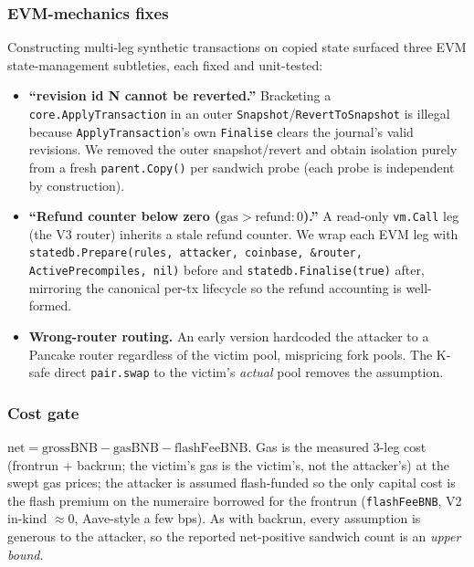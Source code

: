 \documentclass[11pt]{article}
\newcommand{\code}[1]{\texttt{#1}}
\begin{document}
\subsubsection{EVM-mechanics fixes}
\label{sec:evmfixes}
Constructing multi-leg synthetic transactions on copied state surfaced three EVM
state-management subtleties, each fixed and unit-tested:
\begin{itemize}
  \item \textbf{``revision id N cannot be reverted.''} Bracketing a
    \code{core.ApplyTransaction} in an outer \code{Snapshot}/\code{RevertToSnapshot}
    is illegal because \code{ApplyTransaction}'s own \code{Finalise} clears the
    journal's valid revisions. We removed the outer snapshot/revert and obtain
    isolation purely from a fresh \code{parent.Copy()} per sandwich probe (each probe
    is independent by construction).
  \item \textbf{``Refund counter below zero ($\text{gas}>\text{refund}:0$).''} A
    read-only \code{vm.Call} leg (the V3 router) inherits a stale refund counter. We
    wrap each EVM leg with \code{statedb.Prepare(rules, attacker, coinbase, \&router,
    ActivePrecompiles, nil)} before and \code{statedb.Finalise(true)} after, mirroring
    the canonical per-tx lifecycle so the refund accounting is well-formed.
  \item \textbf{Wrong-router routing.} An early version hardcoded the attacker to a
    Pancake router regardless of the victim pool, mispricing fork pools. The K-safe
    direct \code{pair.swap} to the victim's \emph{actual} pool removes the assumption.
\end{itemize}

\subsubsection{Cost gate}
$\text{net}=\text{grossBNB}-\text{gasBNB}-\text{flashFeeBNB}$. Gas is the measured
3-leg cost (frontrun $+$ backrun; the victim's gas is the victim's, not the
attacker's) at the swept gas prices; the attacker is assumed flash-funded so the only
capital cost is the flash premium on the numeraire borrowed for the frontrun
(\code{flashFeeBNB}, V2 in-kind $\approx 0$, Aave-style a few bps). As with backrun,
every assumption is generous to the attacker, so the reported net-positive sandwich
count is an \emph{upper bound}.
\end{document}

